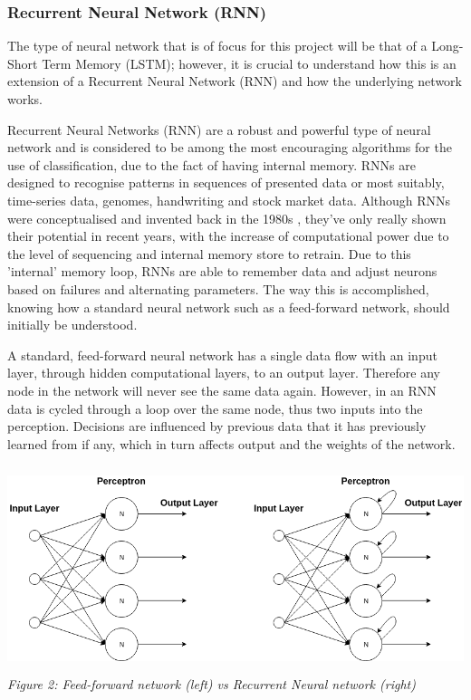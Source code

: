 \documentclass[oneside, 12pt]{article}
\begin{document}
			\subsubsection{Recurrent Neural Network (RNN)}\label{types}
			The type of neural network that is of focus for this project will be that of a Long-Short Term Memory (LSTM); however, it is crucial to understand how this is an extension of a Recurrent Neural Network (RNN) and how the underlying network works.
			
			Recurrent Neural Networks (RNN) are a robust and powerful type of neural network and is considered to be among the most encouraging algorithms for the use of classification, due to the fact of having internal memory. RNNs are designed to recognise patterns in sequences of presented data or most suitably, time-series data, genomes, handwriting and stock market data. Although RNNs were conceptualised and invented back in the 1980s \cite{ErrorProp}, they've only really shown their potential in recent years, with the increase of computational power due to the level of sequencing and internal memory store to retrain.
			Due to this 'internal' memory loop, RNNs are able to remember data and adjust neurons based on failures and alternating parameters. The way this is accomplished, knowing how a standard neural network such as a feed-forward network, should initially be understood. \cite{BeginLSTMRNN}
			
			A standard, feed-forward neural network has a single data flow with an input layer, through hidden computational layers, to an output layer. Therefore any node in the network will never see the same data again. However, in an RNN data is cycled through a loop over the same node, thus two inputs into the perception. Decisions are influenced by previous data that it has previously learned from if any, which in turn affects output and the weights of the network. \cite{RNNLSTMtds}
			
			\begin{center}
				\includegraphics[width=15cm,height=6cm]{images/rnn_ffn.png}
				\newline
				\textit{Figure 2: Feed-forward network (left) vs Recurrent Neural network (right)}
			\end{center}
		
\end{document}
